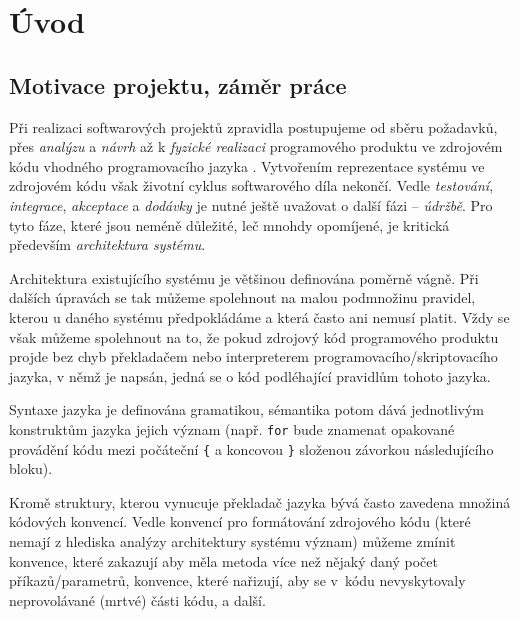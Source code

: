 \chapter{Úvod}

\section{Motivace projektu, záměr práce}
\label{introduction-motivation}

Při realizaci softwarových projektů zpravidla postupujeme od sběru požadavků, přes \emph{analýzu} a \emph{návrh} až k \emph{fyzické realizaci} programového produktu ve zdrojovém kódu vhodného programovacího jazyka \cite{wiki:sdlc}. Vytvořením reprezentace systému ve zdrojovém kódu však životní cyklus softwarového díla nekončí. Vedle \emph{testování}, \emph{integrace}, \emph{akceptace} a \emph{dodávky} je nutné ještě uvažovat o další fázi -- \emph{údržbě}. Pro tyto fáze, které jsou neméně důležité, leč mnohdy opomíjené, je kritická především \emph{architektura systému}.

Architektura existujícího systému je většinou definována poměrně vágně. Při dalších úpravách se tak můžeme spolehnout na malou podmnožinu pravidel, kterou u daného systému předpokládáme a která často ani nemusí platit. Vždy se však můžeme spolehnout na to, že pokud zdrojový kód programového produktu projde bez chyb překladačem nebo interpreterem programovacího/skriptovacího jazyka, v němž je napsán, jedná se o kód podléhající pravidlům tohoto jazyka.

Syntaxe jazyka je definována gramatikou, sémantika potom dává jednotlivým konstruktům jazyka jejich význam (např. \verb+for+ bude znamenat opakované provádění kódu mezi počáteční \verb+{+ a koncovou \verb+}+ složenou závorkou následujícího bloku).

Kromě struktury, kterou vynucuje překladač jazyka bývá často zavedena množiná kódových konvencí. Vedle konvencí pro formátování zdrojového kódu (které nemají z hlediska analýzy architektury systému význam) můžeme zmínit konvence, které zakazují aby měla metoda více než nějaký daný počet příkazů/parametrů, konvence, které nařizují, aby se v~kódu nevyskytovaly neprovolávané (mrtvé) části kódu, a další.

